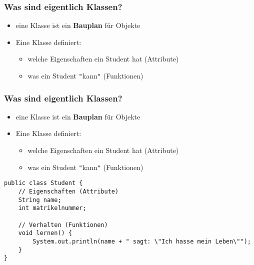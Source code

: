 \documentclass{../../presentation}
\begin{document}
\begin{frame}[fragile,t]
	\frametitle{Was sind eigentlich Klassen?}

	\begin{minipage}[t][0.9\textheight][t]{\textwidth}
		\begin{itemize}
			\item eine Klasse ist ein \textbf{Bauplan} für Objekte
			\item<2->Eine Klasse definiert:
			      \begin{itemize}
				      \item[\textbullet] welche Eigenschaften ein Student hat (Attribute)
				      \item[\textbullet] was ein Student \texttt{"}kann\texttt{"} (Funktionen)
			      \end{itemize}
		\end{itemize}

		\vspace{3.5cm}
	\end{minipage}

\end{frame}



\begin{frame}[fragile,t]
	\frametitle{Was sind eigentlich Klassen?}

	\begin{minipage}[t][0.9\textheight][t]{\textwidth}
		\begin{itemize}
			\item eine Klasse ist ein \textbf{Bauplan} für Objekte
			\item Eine Klasse definiert:
			      \begin{itemize}
				      \item[\textbullet] welche Eigenschaften ein Student hat (Attribute)
				      \item[\textbullet] was ein Student \texttt{"}kann\texttt{"} (Funktionen)
			      \end{itemize}
		\end{itemize}

		\begin{verbatim}
public class Student {
    // Eigenschaften (Attribute)
    String name;
    int matrikelnummer;

    // Verhalten (Funktionen)
    void lernen() {
        System.out.println(name + " sagt: \"Ich hasse mein Leben\"");
    }
}
\end{verbatim}
	\end{minipage}
\end{frame}
\end{document}

